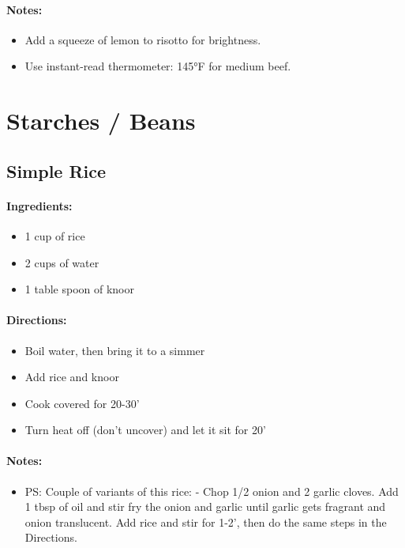 \documentclass{article}
\begin{document}
\paragraph{Notes:}
\begin{itemize}
    \item Add a squeeze of lemon to risotto for brightness.
    \item Use instant-read thermometer: 145°F for medium beef.
\end{itemize}

\section{Starches / Beans}


\subsection{Simple Rice}

\paragraph{Ingredients:}
\begin{itemize}
    \item 1 cup of rice
    \item 2 cups of water
    \item 1 table spoon of knoor
\end{itemize}

\paragraph{Directions:}
\begin{itemize}
    \item Boil water, then bring it to a simmer
    \item Add rice and knoor
    \item Cook covered for 20-30'
    \item Turn heat off (don't uncover) and let it sit for 20'
\end{itemize}

\paragraph{Notes:}
\begin{itemize}
    \item PS: Couple of variants of this rice: - Chop 1/2 onion and 2 garlic cloves. Add 1 tbsp of oil and stir fry the onion and garlic until garlic gets fragrant and onion translucent. Add rice and stir for 1-2’, then do the same steps in the Directions.
\end{itemize}
\end{document}
